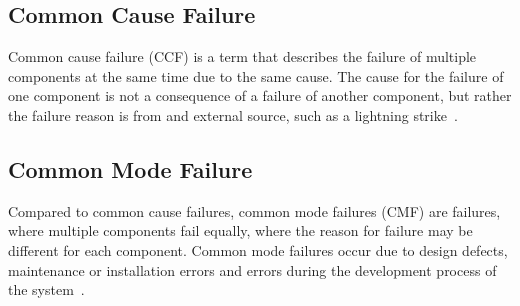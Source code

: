 \subsection{Common Cause Failure}\label{subsec:common-cause-failure}
Common cause failure (CCF) is a term that describes the failure of multiple components at the same time due to the same cause.
The cause for the failure of one component is not a consequence of a failure of another component, but rather the failure reason is from and
external source, such as a lightning strike~\cite{ccf,cmf}.

\subsection{Common Mode Failure}\label{subsec:common-mode-failure}
Compared to common cause failures, common mode failures (CMF) are failures, where multiple components fail equally, where the reason
for failure may be different for each component.
Common mode failures occur due to design defects, maintenance or installation errors and errors during the development process
of the system~\cite{lfs2,cmf}.


